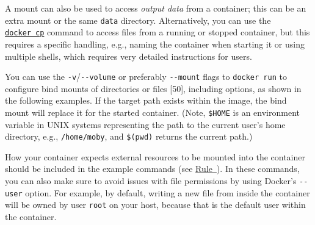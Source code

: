 \documentclass[10pt,letterpaper]{article}
\newenvironment{Shaded}{\begin{snugshade}}{\end{snugshade}}
\newcommand{\BuiltInTok}[1]{#1}
\newcommand{\CommentTok}[1]{\textcolor[rgb]{0.56,0.35,0.01}{\textit{#1}}}
\newcommand{\ExtensionTok}[1]{#1}
\newcommand{\NormalTok}[1]{#1}
\newcommand{\VariableTok}[1]{\textcolor[rgb]{0.00,0.00,0.00}{#1}}
\begin{document}
A mount can also be used to access \emph{output data} from a container;
this can be an extra mount or the same \texttt{data} directory.
Alternatively, you can use the
\href{https://docs.docker.com/engine/reference/commandline/cp/}{\texttt{docker\ cp}}
command to access files from a running or stopped container, but this
requires a specific handling, e.g., naming the container when starting
it or using multiple shells, which requires very detailed instructions
for users.

You can use the \texttt{-v}/\texttt{-\/-volume} or preferably
\texttt{-\/-mount} flags to \texttt{docker\ run} to configure bind
mounts of directories or files {[}50{]}, including options, as shown in
the following examples. If the target path exists within the image, the
bind mount will replace it for the started container. (Note,
\texttt{\$HOME} is an environment variable in UNIX systems representing
the path to the current user's home directory, e.g.,
\texttt{/home/moby}, and \texttt{\$(pwd)} returns the current path.)

\footnotesize

\begin{Shaded}
\end{Shaded}

\normalsize

How your container expects external resources to be mounted into the
container should be included in the example commands (see
\hyperref[{rule:formatting}]{Rule~}). In
these commands, you can also make sure to avoid issues with file
permissions by using Docker's \texttt{-\/-user} option. For example, by
default, writing a new file from inside the container will be owned by
user \texttt{root} on your host, because that is the default user within
the container.
\end{document}
